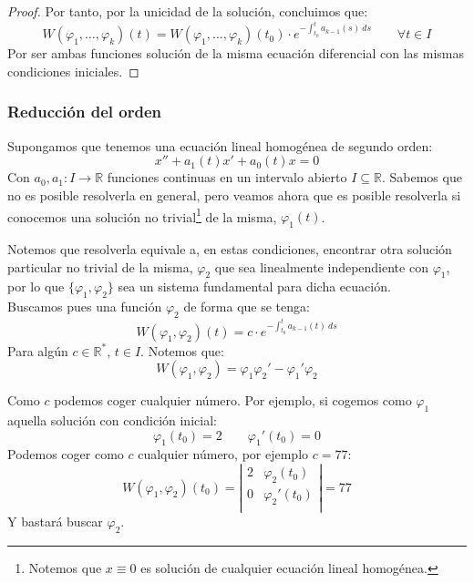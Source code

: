 \begin{proof}
    Por tanto, por la unicidad de la solución, concluimos que:
    \begin{equation*}
        W(\varphi_1,\ldots,\varphi_k)(t) = W(\varphi_1,\ldots,\varphi_k)(t_0) \cdot e^{\displaystyle - \int_{t_0}^{t} a_{k-1}(s)~ds } \qquad \forall t\in I
    \end{equation*}
    Por ser ambas funciones solución de la misma ecuación diferencial con las mismas condiciones iniciales.
\end{proof}

\subsubsection{Reducción del orden}
\noindent
Supongamos que tenemos una ecuación lineal homogénea de segundo orden:
\begin{equation*}
    x'' + a_1(t) x' + a_0(t) x = 0
\end{equation*}
Con $a_0,a_1:I\rightarrow\mathbb{R}$ funciones continuas en un intervalo abierto $I\subseteq \mathbb{R}$.
Sabemos que no es posible resolverla en general, pero veamos ahora que es posible resolverla si conocemos una solución no trivial\footnote{Notemos que $x\equiv 0$ es solución de cualquier ecuación lineal homogénea.} de la misma, $\varphi_1(t)$.

Notemos que resolverla equivale a, en estas condiciones, encontrar otra solución particular no trivial de la misma, $\varphi_2$ que sea linealmente independiente con $\varphi_1$, por lo que $\{\varphi_1,\varphi_2\}$ sea un sistema fundamental para dicha ecuación.\\

Buscamos pues una función $\varphi_2$ de forma que se tenga:
\begin{equation*}
    W(\varphi_1,\varphi_2)(t) = c \cdot  e^{\displaystyle -\int_{t_0}^{t} a_{k-1}(t)~ds }
\end{equation*}
Para algún $c\in \mathbb{R}^\ast$, $t\in I$. Notemos que:
\begin{equation*}
    W(\varphi_1,\varphi_2) = \varphi_1\varphi_2' - \varphi_1' \varphi_2
\end{equation*}

\begin{ejemplo}
    Como $c$ podemos coger cualquier número. Por ejemplo, si cogemos como $\varphi_1$ aquella solución con condición inicial:
    \begin{equation*}
        \varphi_1(t_0) = 2 \qquad \varphi_1'(t_0) = 0
    \end{equation*}
    Podemos coger como $c$ cualquier número, por ejemplo $c=77$:
    \begin{equation*}
        W(\varphi_1,\varphi_2)(t_0) = \left|\begin{array}{cc}
            2 & \varphi_2(t_0)  \\
            0 & \varphi_2'(t_0) \\
        \end{array}\right| = 77
    \end{equation*}
    Y bastará buscar $\varphi_2$.
\end{ejemplo}

